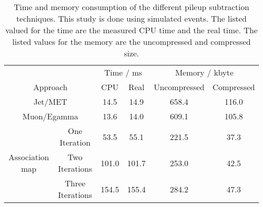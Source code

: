 
\begin{table}[h]
    \begin{center}
        \caption[Time and memory consumption of the different pileup subtraction techniques at \ttbar{} events]{Time and memory consumption of the different pileup subtraction techniques. This study is done using simulated \ttbar events. The listed valued for the time are the measured CPU time and the real time. The listed values for the memory are the uncompressed and compressed size.}
        \label{tab:OSPTimMemTT}
        
        \begin{tabular}{c c c c c c}
            & & \multicolumn{2}{c}{Time / ms} & \multicolumn{2}{c}{Memory / kbyte}  \\
            \multicolumn{2}{c}{Approach} & CPU & Real & Uncompressed & Compressed \\
            \midrule[2pt]
            \multicolumn{2}{c}{Jet/MET}  & 14.5 & 14.9 & 658.4  & 116.0 \\
            \midrule
            \multicolumn{2}{c}{Muon/Egamma}  & 13.6 & 14.0 & 609.1 & 105.8 \\
            \midrule
            \multirow{3}{*}{Association map}
            & One Iteration & 53.5 & 55.1 & 221.5 & 37.3 \\
            \cmidrule{2-6}
            & Two Iterations & 101.0 & 101.7 & 253.0 & 42.5 \\
            \cmidrule{2-6}
            & Three Iterations  & 154.5 & 155.4 & 284.2 & 47.3 \\
            
        \end{tabular}
        
    \end{center}
\end{table}